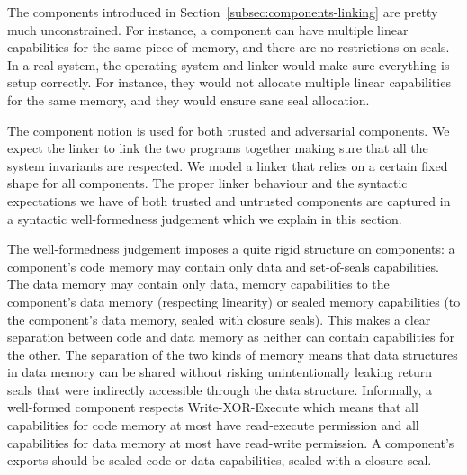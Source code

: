 \documentclass[acmsmall,screen]{acmart}\settopmatter{}
\newenvironment{jversion}%
    {\color{OliveGreen}}{}
\begin{document}
\begin{jversion}
  The components introduced in Section~\ref{subsec:components-linking} are pretty much unconstrained.
  For instance, a component can have multiple linear capabilities for the same piece of memory, and there are no restrictions on seals.
  In a real system, the operating system and linker  %
  would make sure everything is setup correctly.
  For instance, they would not allocate multiple linear capabilities for the same memory, and they would ensure sane seal allocation.

  The component notion is used for both trusted and adversarial components.
  We expect the linker to link the two programs together making sure that all the system invariants are respected.
  We model a linker that relies on a certain fixed shape for all components.
  The proper linker behaviour and the syntactic expectations we have of both trusted and untrusted components are captured in a syntactic well-formedness judgement which we explain in this section.

  The well-formedness judgement imposes a quite rigid structure on components: a component's code memory may contain only data and set-of-seals capabilities.
  The data memory may contain only data, memory capabilities to the component's data memory (respecting linearity) or sealed memory capabilities (to the component's data memory, sealed with closure seals).
  This makes a clear separation between code and data memory as neither can contain capabilities for the other.
  The separation of the two kinds of memory means that data structures in data memory can be shared without risking unintentionally leaking return seals that were indirectly accessible through the data structure.
  Informally, a well-formed component respects Write-XOR-Execute which means that all capabilities for code memory at most have read-execute permission and all capabilities for data memory at most have read-write permission.
  A component's exports should be sealed code or data capabilities, sealed with a closure seal.


\end{jversion}
\end{document}
